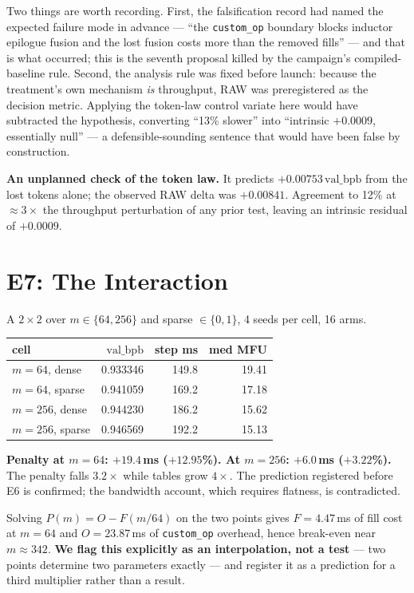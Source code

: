 \documentclass{article}
\newcommand{\vb}{\mathrm{val\_bpb}}
\begin{document}
Two things are worth recording. First, the falsification record had named the expected failure mode in advance --- ``the \texttt{custom\_op} boundary blocks inductor epilogue fusion and the lost fusion costs more than the removed fills'' --- and that is what occurred; this is the seventh proposal killed by the campaign's compiled-baseline rule. Second, the analysis rule was fixed before launch: because the treatment's own mechanism \emph{is} throughput, RAW was preregistered as the decision metric. Applying the token-law control variate here would have subtracted the hypothesis, converting ``13\% slower'' into ``intrinsic $+0.0009$, essentially null'' --- a defensible-sounding sentence that would have been false by construction.

\textbf{An unplanned check of the token law.} It predicts $+0.00753\,\vb$ from the lost tokens alone; the observed RAW delta was $+0.00841$. Agreement to 12\% at $\approx3\times$ the throughput perturbation of any prior test, leaving an intrinsic residual of $+0.0009$.

\section{E7: The Interaction}
A $2\times2$ over $m \in \{64, 256\}$ and sparse $\in \{0,1\}$, 4 seeds per cell, 16 arms.

\begin{center}\begin{small}
\begin{tabular}{lrrr}
\toprule
cell & $\vb$ & step ms & med MFU \\
\midrule
$m{=}64$, dense  & 0.933346 & 149.8 & 19.41 \\
$m{=}64$, sparse & 0.941059 & 169.2 & 17.18 \\
$m{=}256$, dense & 0.944230 & 186.2 & 15.62 \\
$m{=}256$, sparse& 0.946569 & 192.2 & 15.13 \\
\bottomrule
\end{tabular}
\end{small}\end{center}

\textbf{Penalty at $m{=}64$: $+19.4$\,ms ($+12.95$\%). At $m{=}256$: $+6.0$\,ms ($+3.22$\%).} The penalty falls $3.2\times$ while tables grow $4\times$. The prediction registered before E6 is confirmed; the bandwidth account, which requires flatness, is contradicted.

Solving $P(m)=O-F(m/64)$ on the two points gives $F=4.47$\,ms of fill cost at $m{=}64$ and $O=23.87$\,ms of \texttt{custom\_op} overhead, hence break-even near $m\approx342$. \textbf{We flag this explicitly as an interpolation, not a test} --- two points determine two parameters exactly --- and register it as a prediction for a third multiplier rather than a result.
\end{document}
